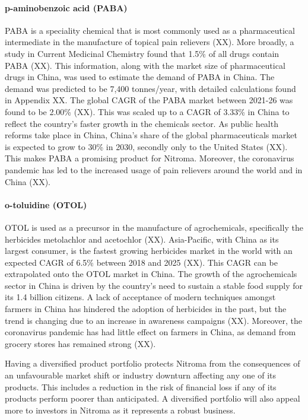 \paragraph{p-aminobenzoic acid (PABA)}
PABA is a speciality chemical that is most commonly used as a pharmaceutical intermediate in the manufacture of topical pain relievers (XX). More broadly, a study in Current Medicinal Chemistry found that 1.5\% of all drugs contain PABA (XX). This information, along with the market size of pharmaceutical drugs in China, was used to estimate the demand of PABA in China. The demand was predicted to be 7,400 tonnes/year, with detailed calculations found in Appendix XX. The global CAGR of the PABA market between 2021-26 was found to be 2.00\% (XX). This was scaled up to a CAGR of 3.33\% in China to reflect the country’s faster growth in the chemicals sector. As public health reforms take place in China, China’s share of the global pharmaceuticals market is expected to grow to 30\% in 2030, secondly only to the United States (XX). This makes PABA a promising product for Nitroma. Moreover, the coronavirus pandemic has led to the increased usage of pain relievers around the world and in China (XX).

\paragraph{o-toluidine (OTOL)}
OTOL is used as a precursor in the manufacture of agrochemicals, specifically the herbicides metolachlor and acetochlor (XX). Asia-Pacific, with China as its largest consumer, is the fastest growing herbicides market in the world with an expected CAGR of 6.5\% between 2018 and 2025 (XX). This CAGR can be extrapolated onto the OTOL market in China. The growth of the agrochemicals sector in China is driven by the country’s need to sustain a stable food supply for its 1.4 billion citizens. A lack of acceptance of modern techniques amongst farmers in China has hindered the adoption of herbicides in the past, but the trend is changing due to an increase in awareness campaigns (XX). Moreover, the coronavirus pandemic has had little effect on farmers in China, as demand from grocery stores has remained strong (XX).

Having a diversified product portfolio protects Nitroma from the consequences of an unfavourable market shift or industry downturn affecting any one of its products. This includes a reduction in the risk of financial loss if any of its products perform poorer than anticipated. A diversified portfolio will also appeal more to investors in Nitroma as it represents a robust business. 